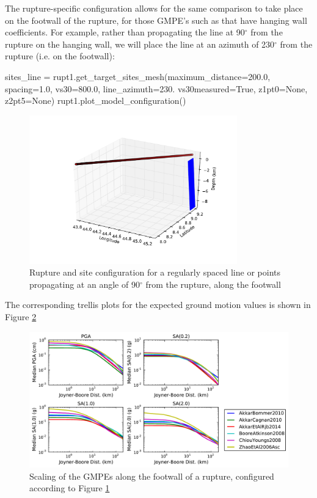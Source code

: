 The rupture-specific configuration allows for the same comparison to take place on the footwall of the rupture, for those GMPE's such as \cite{chiou2008} that have hanging wall coefficients. For example, rather than propagating the line at 90$^{\circ}$ from the rupture on the hanging wall, we will place the line at an azimuth of 230$^{\circ}$ from the rupture (i.e. on the footwall):

\begin{python}
sites_line = rupt1.get_target_sites_mesh(maximum_distance=200.0,
                                         spacing=1.0,
                                         vs30=800.0,
                                         line_azimuth=230.
                                         vs30measured=True,
                                         z1pt0=None,
                                         z2pt5=None)
rupt1.plot_model_configuration()
\end{python}

\begin{figure}[htbp]
	\centering
		\includegraphics[width=9cm]{./figures/trellis/rupt_config_footwall.pdf}
	\caption{Rupture and site configuration for a regularly spaced line or points propagating at an angle of 90$^{\circ}$ from the rupture, along the  footwall}
	\label{fig:rupt_config_footwall}
\end{figure}

The corresponding trellis plots for the expected ground motion values is shown in Figure \ref{fig:distance_footwall_trellis_rupt}
\begin{figure}[htb]
	\centering
		\includegraphics[width=\textwidth]{./figures/trellis/distance_footwall_trellis_rupt.pdf}
	\caption{Scaling of the GMPEs along the footwall of a rupture, configured according to Figure \ref{fig:rupt_config_footwall}}
	\label{fig:distance_footwall_trellis_rupt}
\end{figure}

